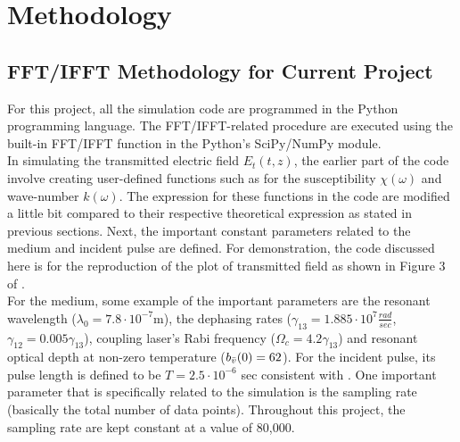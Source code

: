 \chapter{Methodology}

\section{FFT/IFFT Methodology for Current Project}
For this project, all the simulation code are programmed in the Python programming language. The FFT/IFFT-related procedure are executed using the built-in FFT/IFFT function in the Python's SciPy/NumPy module.\\

In simulating the transmitted electric field $E_{t}(t, z)$, the earlier part of the code involve creating user-defined functions such as for the susceptibility $\chi(\omega)$ and wave-number $k(\omega)$. The expression for these functions in the code are modified a little bit compared to their respective theoretical expression as stated in previous sections. Next, the important constant parameters related to the medium and incident pulse are defined. For demonstration, the code discussed here is for the reproduction of the plot of transmitted field as shown in Figure 3 of \cite{jeong2010slow}.\\

For the medium, some example of the important parameters are the resonant wavelength ($\lambda_{0} = 7.8 \cdot 10^{-7}$m), the dephasing rates ($\gamma_{13} = 1.885 \cdot 10^{7} \frac{rad}{sec}$, $\gamma_{12} = 0.005\gamma_{13}$), coupling laser's Rabi frequency ($\Omega_{c} = 4.2\gamma_{13}$) and resonant optical depth at non-zero temperature ($b_{\Bar{v}}(0) = 62$). For the incident pulse, its pulse length is defined to be $T = 2.5 \cdot 10^{-6}$ sec consistent with \cite{jeong2010slow}. One important parameter that is specifically related to the simulation is the sampling rate (basically the total number of data points). Throughout this project, the sampling rate are kept constant at a value of 80,000.
